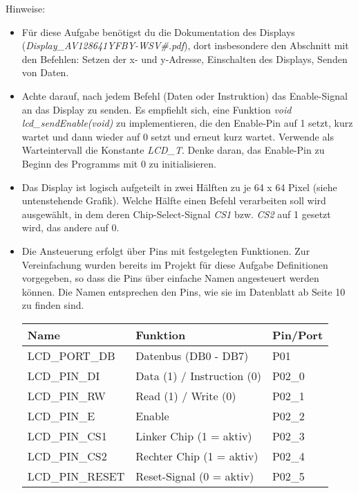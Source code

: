 \documentclass[
  accentcolor=tud1c,	%
  colorbacktitle,		%
  inverttitle,			%
  german,				%
  twoside
]{tudexercise}
\begin{document}
Hinweise:
\begin{itemize}
\item
Für diese Aufgabe benötigst du die Dokumentation des Displays (\textit{Display\_AV128641YFBY-WSV\#.pdf}), dort insbesondere den Abschnitt mit den Befehlen: Setzen der x- und y-Adresse, Einschalten des Displays, Senden von Daten.

\item
Achte darauf, nach jedem Befehl (Daten oder Instruktion) das Enable-Signal an das Display zu senden.
Es empfiehlt sich, eine Funktion \textit{void lcd\_sendEnable(void)} zu implementieren, die den Enable-Pin auf 1 setzt, kurz wartet und dann wieder auf 0 setzt und erneut kurz wartet.
Verwende als Warteintervall die Konstante \emph{LCD\_T}.
Denke daran, das Enable-Pin zu Beginn des Programms mit 0 zu initialisieren.

\item
Das Display ist logisch aufgeteilt in zwei Hälften zu je 64 x 64 Pixel (siehe untenstehende Grafik).
Welche Hälfte einen Befehl verarbeiten soll wird ausgewählt, in dem deren Chip-Select-Signal \emph{CS1} bzw. \emph{CS2} auf 1 gesetzt wird, das andere auf 0.

\item
Die Ansteuerung erfolgt über Pins mit festgelegten Funktionen. Zur Vereinfachung wurden bereits im Projekt für diese Aufgabe Definitionen vorgegeben, so dass die Pins über einfache Namen angesteuert werden können. Die Namen entsprechen den Pins, wie sie im Datenblatt ab Seite 10 zu finden sind.

\begin{center}
\begin{tabular}{l|l|l}
	\toprule
\textbf{Name} & \textbf{Funktion} & \textbf{Pin/Port} \\ 
 \midrule
LCD\_PORT\_DB & Datenbus (DB0 - DB7) & P01 \\ 
LCD\_PIN\_DI & Data (1) / Instruction (0) & P02\_0 \\ 
LCD\_PIN\_RW & Read (1) / Write (0) & P02\_1 \\ 
LCD\_PIN\_E & Enable & P02\_2 \\ 
LCD\_PIN\_CS1 & Linker Chip (1 = aktiv) & P02\_3 \\ 
LCD\_PIN\_CS2 & Rechter Chip (1 = aktiv) & P02\_4 \\ 
LCD\_PIN\_RESET & Reset-Signal (0 = aktiv) & P02\_5 \\ 
\bottomrule
\end{tabular}
\end{center}


\end{itemize}
\end{document}

